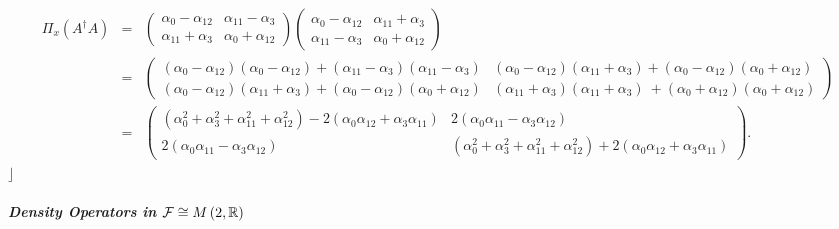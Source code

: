 \documentclass[aps,preprint]{revtex4}
\begin{document}
\begin{eqnarray}
\mathcal{\Pi }_{x}\left( A^{\dagger }A\right) &=&\left( 
\begin{array}{cc}
\alpha _{0}-\alpha _{12} & \alpha _{11}-\alpha _{3} \\ 
\alpha _{11}+\alpha _{3} & \alpha _{0}+\alpha _{12}%
\end{array}%
\right) \left( 
\begin{array}{cc}
\alpha _{0}-\alpha _{12} & \alpha _{11}+\alpha _{3} \\ 
\alpha _{11}-\alpha _{3} & \alpha _{0}+\alpha _{12}%
\end{array}%
\right) \\
&=&\left( 
\begin{array}{cc}
\left( \alpha _{0}-\alpha _{12}\right) \left( \alpha _{0}-\alpha
_{12}\right) +\left( \alpha _{11}-\alpha _{3}\right) \left( \alpha
_{11}-\alpha _{3}\right) & \left( \alpha _{0}-\alpha _{12}\right) \left(
\alpha _{11}+\alpha _{3}\right) +\left( \alpha _{0}-\alpha _{12}\right)
\left( \alpha _{0}+\alpha _{12}\right) \\ 
\left( \alpha _{0}-\alpha _{12}\right) \left( \alpha _{11}+\alpha
_{3}\right) +\left( \alpha _{0}-\alpha _{12}\right) \left( \alpha
_{0}+\alpha _{12}\right) & \left( \alpha _{11}+\alpha _{3}\right) \left(
\alpha _{11}+\alpha _{3}\right) \ +\left( \alpha _{0}+\alpha _{12}\right)
\left( \alpha _{0}+\alpha _{12}\right)%
\end{array}%
\right) \\
&=&\left( 
\begin{array}{cc}
\left( \alpha _{0}^{2}+\alpha _{3}^{2}+\alpha _{11}^{2}+\alpha
_{12}^{2}\right) -2\left( \alpha _{0}\alpha _{12}+\alpha _{3}\alpha
_{11}\right) & 2\left( \alpha _{0}\alpha _{11}-\alpha _{3}\alpha _{12}\right)
\\ 
2\left( \alpha _{0}\alpha _{11}-\alpha _{3}\alpha _{12}\right) & \left(
\alpha _{0}^{2}+\alpha _{3}^{2}+\alpha _{11}^{2}+\alpha _{12}^{2}\right)
+2\left( \alpha _{0}\alpha _{12}+\alpha _{3}\alpha _{11}\right)%
\end{array}%
\right) .
\end{eqnarray}%
$\rfloor $

\subparagraph{Density Operators in $\mathcal{F}\protect\cong M\left( 2,%
\mathbb{R}\right) $}
\end{document}
